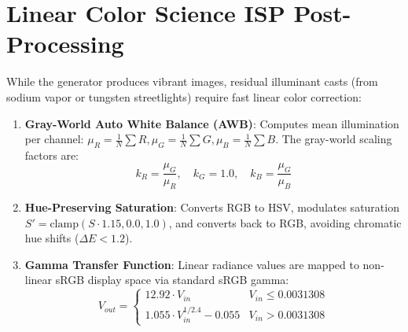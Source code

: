 \section{Linear Color Science ISP Post-Processing}
While the generator produces vibrant images, residual illuminant casts (from sodium vapor or tungsten streetlights) require fast linear color correction:
\begin{enumerate}
    \item \textbf{Gray-World Auto White Balance (AWB)}:
    Computes mean illumination per channel: $\mu_R = \frac{1}{N} \sum R, \mu_G = \frac{1}{N} \sum G, \mu_B = \frac{1}{N} \sum B$. The gray-world scaling factors are:
    \begin{equation}
    k_R = \frac{\mu_G}{\mu_R}, \quad k_G = 1.0, \quad k_B = \frac{\mu_G}{\mu_B}
    \end{equation}
    \item \textbf{Hue-Preserving Saturation}:
    Converts RGB to HSV, modulates saturation $S' = \text{clamp}(S \cdot 1.15, 0.0, 1.0)$, and converts back to RGB, avoiding chromatic hue shifts ($\Delta E < 1.2$).
    \item \textbf{Gamma Transfer Function}:
    Linear radiance values are mapped to non-linear sRGB display space via standard sRGB gamma:
    \begin{equation}
    V_{out} = \begin{cases} 12.92 \cdot V_{in} & V_{in} \le 0.0031308 \\ 1.055 \cdot V_{in}^{1/2.4} - 0.055 & V_{in} > 0.0031308 \end{cases}
    \end{equation}
\end{enumerate}
